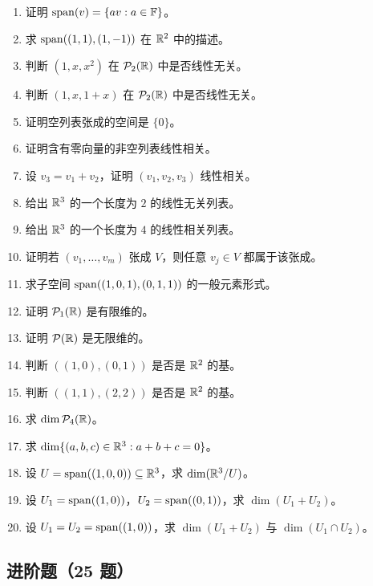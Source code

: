 \begin{enumerate}[label=\textbf{\basic\ \arabic*.}, leftmargin=3em]
\item 证明 $\operatorname{span}(v)=\{av:a\in\mathbb{F}\}$。
\item 求 $\operatorname{span}((1,1),(1,-1))$ 在 $\mathbb{R}^2$ 中的描述。
\item 判断 $(1,x,x^2)$ 在 $\mathcal{P}_2(\mathbb{R})$ 中是否线性无关。
\item 判断 $(1,x,1+x)$ 在 $\mathcal{P}_2(\mathbb{R})$ 中是否线性无关。
\item 证明空列表张成的空间是 $\{0\}$。
\item 证明含有零向量的非空列表线性相关。
\item 设 $v_3=v_1+v_2$，证明 $(v_1,v_2,v_3)$ 线性相关。
\item 给出 $\mathbb{R}^3$ 的一个长度为 $2$ 的线性无关列表。
\item 给出 $\mathbb{R}^3$ 的一个长度为 $4$ 的线性相关列表。
\item 证明若 $(v_1,\dots,v_m)$ 张成 $V$，则任意 $v_j\in V$ 都属于该张成。
\item 求子空间 $\operatorname{span}((1,0,1),(0,1,1))$ 的一般元素形式。
\item 证明 $\mathcal{P}_1(\mathbb{R})$ 是有限维的。
\item 证明 $\mathcal{P}(\mathbb{R})$ 是无限维的。
\item 判断 $((1,0),(0,1))$ 是否是 $\mathbb{R}^2$ 的基。
\item 判断 $((1,1),(2,2))$ 是否是 $\mathbb{R}^2$ 的基。
\item 求 $\dim\mathcal{P}_4(\mathbb{R})$。
\item 求 $\dim\{(a,b,c)\in\mathbb{R}^3:a+b+c=0\}$。
\item 设 $U=\operatorname{span}((1,0,0))\subseteq\mathbb{R}^3$，求 $\dim(\mathbb{R}^3/U)$。
\item 设 $U_1=\operatorname{span}((1,0))$，$U_2=\operatorname{span}((0,1))$，求 $\dim(U_1+U_2)$。
\item 设 $U_1=U_2=\operatorname{span}((1,0))$，求 $\dim(U_1+U_2)$ 与 $\dim(U_1\cap U_2)$。
\end{enumerate}

\subsection*{进阶题（25 题）}

